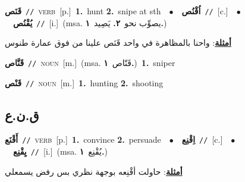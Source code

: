\documentclass[10pt,a4paper,twoside]{article} %
\begin{document}
\begin{multicols}{2}
{\setlength\topsep{0pt}\textbf{\foreignlanguage{arabic}{قَنَص}}\ {\color{gray}\texttt{//}\color{black}}\ \textsc{verb}\ [p.]\ \textbf{1.}~hunt  \textbf{2.}~snipe at sth\ \ $\bullet$\ \ \setlength\topsep{0pt}\textbf{\foreignlanguage{arabic}{اُقْنُص}}\ {\color{gray}\texttt{//}\color{black}}\ [c.]\ \ $\bullet$\ \ \setlength\topsep{0pt}\textbf{\foreignlanguage{arabic}{يُقْنُص}}\ {\color{gray}\texttt{//}\color{black}}\ [i.]\ \color{gray}(msa. \foreignlanguage{arabic}{يصوِّب نحو}~\foreignlanguage{arabic}{\textbf{٢.}}  \foreignlanguage{arabic}{يَصِيد}~\foreignlanguage{arabic}{\textbf{١.}})\color{black}\  \begin{flushright}\color{gray}\foreignlanguage{arabic}{\textbf{\underline{\foreignlanguage{arabic}{أمثلة}}}: واحنا بالمظاهرة في واحد قَنَص علينا من فوق عمارة طنوس}\end{flushright}\color{black}} \vspace{2mm}

{\setlength\topsep{0pt}\textbf{\foreignlanguage{arabic}{قَنَّاص}}\ {\color{gray}\texttt{//}\color{black}}\ \textsc{noun}\ [m.]\ \color{gray}(msa. \foreignlanguage{arabic}{قَنّاص}~\foreignlanguage{arabic}{\textbf{١.}})\color{black}\ \textbf{1.}~sniper\ } \vspace{2mm}

{\setlength\topsep{0pt}\textbf{\foreignlanguage{arabic}{قَنْص}}\ {\color{gray}\texttt{//}\color{black}}\ \textsc{noun}\ [m.]\ \textbf{1.}~hunting  \textbf{2.}~shooting\ } \vspace{2mm}

\vspace{-3mm}
\subsection*{\color{blue}\foreignlanguage{arabic}{ق.ن.ع}\color{blue}{}} 

{\setlength\topsep{0pt}\textbf{\foreignlanguage{arabic}{أَقْنَع}}\ {\color{gray}\texttt{//}\color{black}}\ \textsc{verb}\ [p.]\ \textbf{1.}~convince  \textbf{2.}~persuade\ \ $\bullet$\ \ \setlength\topsep{0pt}\textbf{\foreignlanguage{arabic}{اِقْنِع}}\ {\color{gray}\texttt{//}\color{black}}\ [c.]\ \ $\bullet$\ \ \setlength\topsep{0pt}\textbf{\foreignlanguage{arabic}{يِقْنِع}}\ {\color{gray}\texttt{//}\color{black}}\ [i.]\ \color{gray}(msa. \foreignlanguage{arabic}{يُقْنِع}~\foreignlanguage{arabic}{\textbf{١.}})\color{black}\  \begin{flushright}\color{gray}\foreignlanguage{arabic}{\textbf{\underline{\foreignlanguage{arabic}{أمثلة}}}: حاولت أقْنِعه بوجهة نظري بس رفض يسمعلي}\end{flushright}\color{black}} \vspace{2mm}


\end{multicols}
\end{document}
